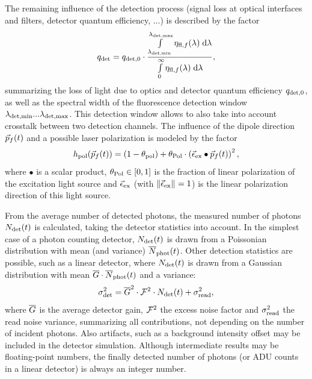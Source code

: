 The remaining influence of the detection process (signal loss at optical interfaces and filters, detector quantum efficiency, ...) is described by the factor
\begin{equation}\label{eq:app_sim_fcs_qdet}
  q_{\text{det}}=q_{{\text{det}},0}\cdot\frac{\int\limits_{\lambda_{\text{det,min}}}^{\lambda_{\text{det,max}}}\eta_{{\text{fl}},f}(\lambda)\;\mathrm{d}\lambda}{\int\limits_{0}^{\infty}\eta_{{\text{fl}},f}(\lambda)\;\mathrm{d}\lambda},
\end{equation}
summarizing the loss of light due to optics and detector quantum efficiency $q_{{\text{det}},0}$, as well as the spectral width of the fluorescence detection window $\lambda_{\text{det,min}}...\lambda_{\text{det,max}}$. This detection window allows to also take into account crosstalk between two detection channels. The influence of the dipole direction $\vec{p}_f(t)$ and a possible laser polarization is modeled by the factor
\begin{equation}\label{eq:app_sim_fcs_hpol}
  h_{\text{pol}}(\vec{p}_f(t))=(1-\theta_{\text{pol}})+\theta_{\text{Pol}}\cdot\left(\vec{\epsilon}_{\text{ex}}\bullet\vec{p}_f(t)\right)^2,
\end{equation}
where $\bullet$ is a scalar product, $\theta_{\text{Pol}}\in[0,1]$ is the fraction of linear polarization of the excitation light source and $\vec{\epsilon}_{\text{ex}}$ (with $\|\vec{\epsilon}_{\text{ex}}\|_{}=1$) is the linear polarization direction of this light source.

From the average number of detected photons, the measured number of photons ${N}_{\text{det}}(t)$ is calculated, taking the detector statistics into account. In the simplest case of a photon counting detector, ${N}_{\text{det}}(t)$ is drawn from a Poissonian distribution with mean (and variance) $\overline{N}_{\text{phot}}(t)$. Other detection statistics are possible, such as a linear detector, where ${N}_{\text{det}}(t)$ is drawn from a Gaussian distribution with mean $\overline{G}\cdot\overline{N}_{\text{phot}}(t)$ and a variance:
\begin{equation}\label{eq:app_sim_fcs_lindetnoise}
  \sigma_{\text{det}}^2=\overline{G}^2\cdot\mathcal{F}^2\cdot{N}_{\text{det}}(t)+\sigma_{\text{read}}^2,
\end{equation}
where $\overline{G}$ is the average detector gain, $\mathcal{F}^2$ the excess noise factor and $\sigma_{\text{read}}^2$ the read noise variance, summarizing all contributions, not depending on the number of incident photons. Also artifacts, such as a background intensity offset may be included in the detector simulation. Although intermediate results may be floating-point numbers, the finally detected number of photons (or ADU counts in a linear detector) is always an integer number.

